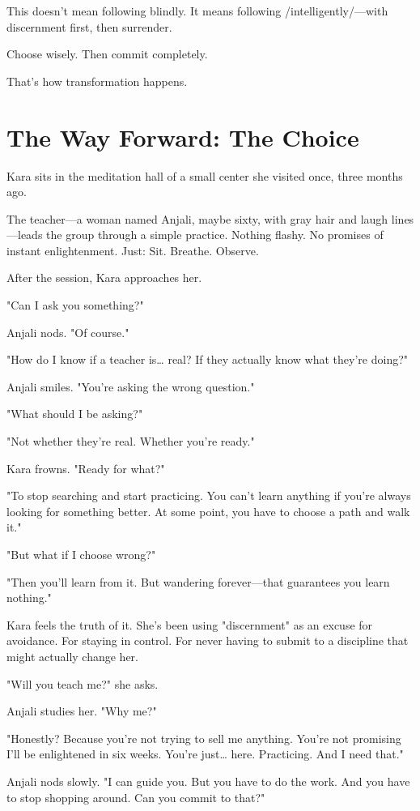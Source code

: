 \documentclass[11pt,twoside]{book}
\begin{document}
This doesn't mean following blindly. It means following /intelligently/—with discernment first, then surrender.

Choose wisely. Then commit completely.

That's how transformation happens.

\section*{The Way Forward: The Choice}

Kara sits in the meditation hall of a small center she visited once, three months ago.

The teacher—a woman named Anjali, maybe sixty, with gray hair and laugh lines—leads the group through a simple practice. Nothing flashy. No promises of instant enlightenment. Just: Sit. Breathe. Observe.

After the session, Kara approaches her.

"Can I ask you something?"

Anjali nods. "Of course."

"How do I know if a teacher is\ldots{} real? If they actually know what they're doing?"

Anjali smiles. "You're asking the wrong question."

"What should I be asking?"

"Not whether they're real. Whether you're ready."

Kara frowns. "Ready for what?"

"To stop searching and start practicing. You can't learn anything if you're always looking for something better. At some point, you have to choose a path and walk it."

"But what if I choose wrong?"

"Then you'll learn from it. But wandering forever—that guarantees you learn nothing."

Kara feels the truth of it. She's been using "discernment" as an excuse for avoidance. For staying in control. For never having to submit to a discipline that might actually change her.

"Will you teach me?" she asks.

Anjali studies her. "Why me?"

"Honestly? Because you're not trying to sell me anything. You're not promising I'll be enlightened in six weeks. You're just\ldots{} here. Practicing. And I need that."

Anjali nods slowly. "I can guide you. But you have to do the work. And you have to stop shopping around. Can you commit to that?"
\end{document}
